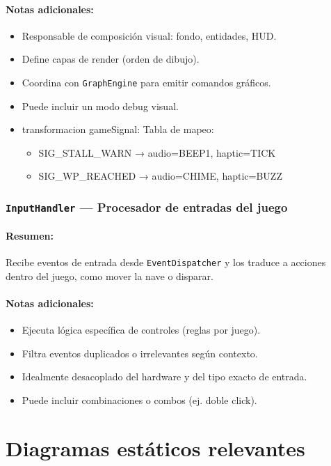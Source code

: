 \documentclass[11pt,a4paper]{article}
\begin{document}
\paragraph{Notas adicionales:}
\begin{itemize}
  \item Responsable de composición visual: fondo, entidades, HUD.
  \item Define capas de render (orden de dibujo).
  \item Coordina con \texttt{GraphEngine} para emitir comandos gráficos.
  \item Puede incluir un modo debug visual.
  \item transformacion gameSignal: Tabla de mapeo:
  \begin{itemize}
    \item SIG\_STALL\_WARN → {audio=BEEP1, haptic=TICK}
    \item SIG\_WP\_REACHED → {audio=CHIME, haptic=BUZZ}
  \end{itemize}
\end{itemize}

\subsubsection{\texttt{InputHandler} — Procesador de entradas del juego}
\paragraph{Resumen:} Recibe eventos de entrada desde \texttt{EventDispatcher} y los traduce a acciones dentro del juego, como mover la nave o disparar.
\paragraph{Notas adicionales:}
\begin{itemize}
  \item Ejecuta lógica específica de controles (reglas por juego).
  \item Filtra eventos duplicados o irrelevantes según contexto.
  \item Idealmente desacoplado del hardware y del tipo exacto de entrada.
  \item Puede incluir combinaciones o combos (ej. doble click).
\end{itemize}


\section{Diagramas estáticos relevantes}
\end{document}
